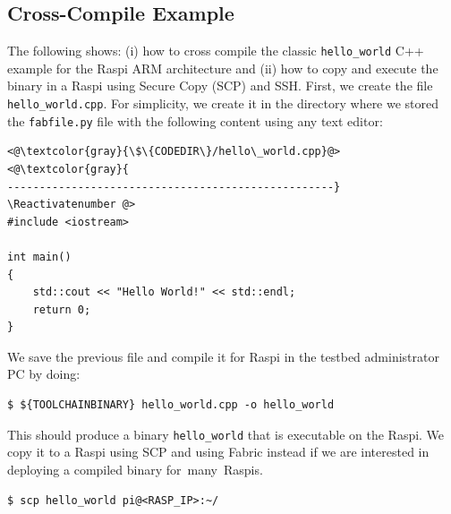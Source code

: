 \documentclass[electronics,article,accept,moreauthors,pdftex,10pt,a4paper]{mdpi}
\theoremstyle{mdpi}
\newcounter{ex}
\newcounter{re}
\theoremstyle{mdpidefinition}
\begin{document}
\subsection{Cross-Compile Example}
The following shows: (i) how to cross compile the classic \texttt{hello\_world}
C++ example for the Raspi ARM architecture and (ii) how to copy and
execute the binary in a Raspi using Secure Copy (SCP) and SSH. First, we
create the file \texttt{hello\_world.cpp}. For simplicity, we create it
in the directory where we stored the \texttt{fabfile.py} file
with the following content using any text editor:

\Suppressnumber\begin{lstlisting}[]
<@\textcolor{gray}{\$\{CODEDIR\}/hello\_world.cpp}@>
<@\textcolor{gray}{
---------------------------------------------------}
\Reactivatenumber @>
#include <iostream>

int main()
{
    std::cout << "Hello World!" << std::endl;
    return 0;
}
\end{lstlisting}
\FloatBarrier
\vspace{-5mm}

We save the previous file and compile it for Raspi in the testbed
administrator PC by doing:

\begin{lstlisting}[]
$ ${TOOLCHAINBINARY} hello_world.cpp -o hello_world
\end{lstlisting}
\FloatBarrier
\vspace{-5mm}

This should produce a binary \texttt{hello\_world} that is executable
on the Raspi. We copy it to a Raspi using SCP and using
Fabric instead if we are interested in deploying a compiled binary \mbox{for
many Raspis.}

\begin{lstlisting}[]
$ scp hello_world pi@<RASP_IP>:~/
\end{lstlisting}
\FloatBarrier
\vspace{-5mm}

\end{document}
